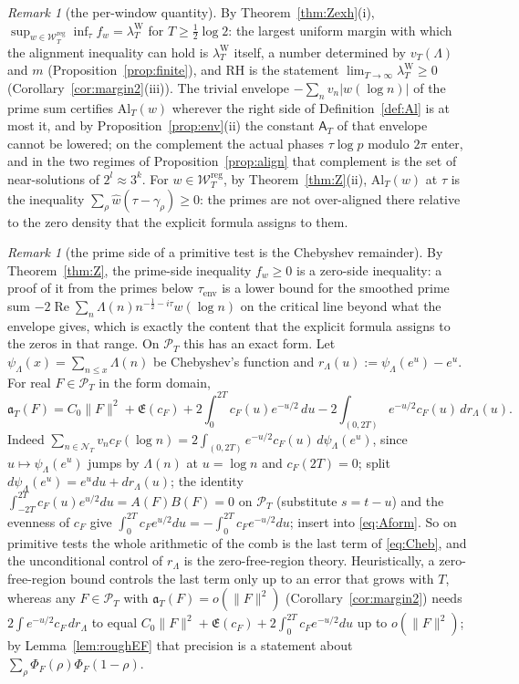 \documentclass[11pt]{amsart}
\theoremstyle{definition}
\theoremstyle{remark}
\newtheorem{remark}[theorem]{Remark}
\newcommand{\Rel}{\operatorname{Re}}
\newcommand{\PT}{\mathcal P_T}
\newcommand{\lamW}{\lambda^{\mathrm W}_T}
\newcommand{\wh}{\widehat w}
\newcommand{\cF}{c_F}
\newcommand{\Lev}{\mathfrak E}
\newcommand{\Wcl}{\mathcal W_T}
\newcommand{\NT}{\mathcal N_T}
\newcommand{\Aconst}{\mathsf A_T}
\begin{document}
\begin{remark}[the per-window quantity]\label{rem:excess}
By Theorem~\ref{thm:Zexh}(i), $\sup_{w\in\Wcl^{\mathrm{reg}}}\inf_\tau f_w=\lamW$ for $T\ge\frac12\log2$: the
largest uniform margin with which the alignment inequality can hold is $\lamW$ itself, a number determined by $v_T(\Lambda)$ and $m$ (Proposition~\ref{prop:finite}), and RH is the
statement $\lim_{T\to\infty}\lamW\ge0$ (Corollary~\ref{cor:margin2}(iii)). The trivial envelope
$-\sum_nv_n|w(\log n)|$ of the prime sum certifies $\mathrm{Al}_T(w)$ wherever the right side of
Definition~\ref{def:Al} is at most it, and by Proposition~\ref{prop:env}(ii) the constant $\Aconst$ of
that envelope cannot be lowered; on the complement the actual phases $\tau\log p$ modulo $2\pi$ enter, and in
the two regimes of Proposition~\ref{prop:align} that complement is the set of near-solutions of
$2^l\approx3^k$. For $w\in\Wcl^{\mathrm{reg}}$, by Theorem~\ref{thm:Z}(ii), $\mathrm{Al}_T(w)$ at $\tau$ is the
inequality $\sum_\rho\wh(\tau-\gamma_\rho)\ge0$: the primes are not over-aligned there relative to the zero
density that the explicit formula assigns to them.
\end{remark}

\begin{remark}[the prime side of a primitive test is the Chebyshev remainder]\label{rem:Cheb}
By Theorem~\ref{thm:Z}, the prime-side inequality $f_w\ge0$ is a zero-side inequality: a proof of it from the
primes below $\tau_{\mathrm{env}}$ is a lower bound for the smoothed prime sum
$-2\Rel\sum_n\Lambda(n)n^{-\frac12-i\tau}w(\log n)$ on the critical line beyond what the envelope gives,
which is exactly the content that the explicit formula assigns to the zeros in that range. On $\PT$ this
has an exact form. Let $\psi_\Lambda(x)=\sum_{n\le x}\Lambda(n)$ be Chebyshev's function and
$r_\Lambda(u):=\psi_\Lambda(e^u)-e^u$. For real $F\in\PT$ in the form domain,
\begin{equation}\label{eq:Cheb}
\mathfrak a_T(F)=C_0\|F\|^2+\Lev(\cF)+2\int_0^{2T}\cF(u)e^{-u/2}\,du-2\int_{(0,2T)}e^{-u/2}\cF(u)\,dr_\Lambda(u).
\end{equation}
Indeed $\sum_{n\in\NT}v_n\cF(\log n)=2\int_{(0,2T)}e^{-u/2}\cF(u)\,d\psi_\Lambda(e^u)$, since
$u\mapsto\psi_\Lambda(e^u)$ jumps by $\Lambda(n)$ at $u=\log n$ and $\cF(2T)=0$; split
$d\psi_\Lambda(e^u)=e^udu+dr_\Lambda(u)$; the identity $\int_{-2T}^{2T}\cF(u)e^{u/2}du=A(F)B(F)=0$ on $\PT$
(substitute $s=t-u$) and the evenness of $\cF$ give $\int_0^{2T}\cF e^{u/2}du=-\int_0^{2T}\cF e^{-u/2}du$; insert
into \eqref{eq:Aform}. So on primitive tests the whole arithmetic of the comb is the last term of
\eqref{eq:Cheb}, and the unconditional control of $r_\Lambda$ is the zero-free-region theory. Heuristically,
a zero-free-region bound controls the last term only up to an error that grows with $T$,
whereas any $F\in\PT$ with $\mathfrak a_T(F)=o(\|F\|^2)$ (Corollary~\ref{cor:margin2}) needs
$2\int e^{-u/2}\cF\,dr_\Lambda$ to equal $C_0\|F\|^2+\Lev(\cF)+2\int_0^{2T}\cF e^{-u/2}du$ up to
$o(\|F\|^2)$; by Lemma~\ref{lem:roughEF} that precision is a statement about
$\sum_\rho\Phi_F(\rho)\Phi_F(1-\rho)$.
\end{remark}
\end{document}
